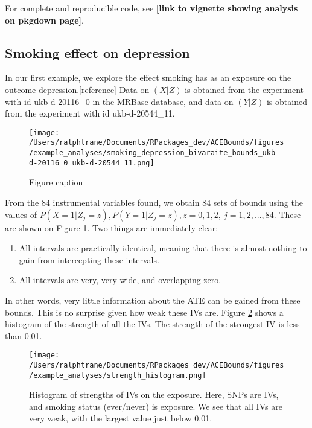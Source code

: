 \documentclass[
]{article}
\providecommand{\tightlist}{%
  \setlength{\itemsep}{0pt}\setlength{\parskip}{0pt}}
\theoremstyle{plain}
\begin{document}
For complete and reproducible code, see \textbf{{[}link to vignette showing analysis on pkgdown page{]}}.

\hypertarget{smoking-effect-on-depression}{%
\subsection{Smoking effect on depression}\label{smoking-effect-on-depression}}

In our first example, we explore the effect smoking has as an exposure on the outcome depression.{[}reference{]} Data on \((X|Z)\) is obtained from the experiment with id ukb-d-20116\_0 in the MRBase database, and data on \((Y|Z)\) is obtained from the experiment with id ukb-d-20544\_11.

\begin{figure}[!h]
  \texttt{[image: /Users/ralphtrane/Documents/RPackages\_dev/ACEBounds/figures/example\_analyses/smoking\_depression\_bivaraite\_bounds\_ukb-d-20116\_0\_ukb-d-20544\_11.png]}
  \caption{Figure caption}
  \label{fig:smoking_on_depression_ind_bounds}
\end{figure}

From the 84 instrumental variables found, we obtain 84 sets of bounds using the values of \(P(X = 1 | Z_j = z), P(Y = 1 | Z_j = z), z = 0,1,2,\ j=1,2,...,84\). These are shown on Figure \ref{fig:smoking_on_depression_ind_bounds}. Two things are immediately clear:

\begin{enumerate}
\def\labelenumi{\arabic{enumi}.}
\tightlist
\item
  All intervals are practically identical, meaning that there is almost nothing to gain from intercepting these intervals.
\item
  All intervals are very, very wide, and overlapping zero.
\end{enumerate}

In other words, very little information about the ATE can be gained from these bounds. This is no surprise given how weak these IVs are. Figure \ref{fig:strength_histogram} shows a histogram of the strength of all the IVs. The strength of the strongest IV is less than 0.01.

\begin{figure}[!h]
  \center
  \texttt{[image: /Users/ralphtrane/Documents/RPackages\_dev/ACEBounds/figures/example\_analyses/strength\_histogram.png]}
  \caption{Histogram of strengths of IVs on the exposure. Here, SNPs are IVs, and smoking status (ever/never) is exposure. We see that all IVs are very weak, with the largest value just below 0.01.}
  \label{fig:strength_histogram}
\end{figure}
\end{document}
